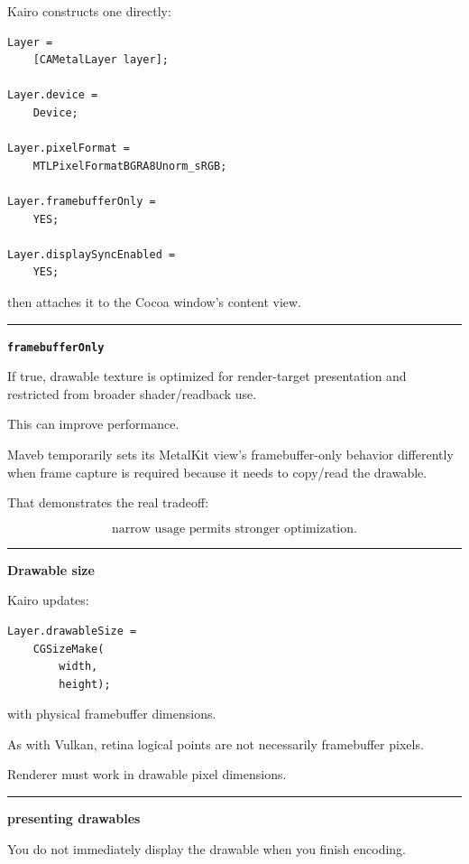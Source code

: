 Kairo constructs one directly:

\begin{verbatim}
Layer =
    [CAMetalLayer layer];

Layer.device =
    Device;

Layer.pixelFormat =
    MTLPixelFormatBGRA8Unorm_sRGB;

Layer.framebufferOnly =
    YES;

Layer.displaySyncEnabled =
    YES;
\end{verbatim}

then attaches it to the Cocoa window's content view.

\begin{center}\rule{0.5\linewidth}{0.5pt}\end{center}

\textbf{\texttt{framebufferOnly}}

If true, drawable texture is optimized for render-target presentation and restricted from broader shader/readback use.

This can improve performance.

Maveb temporarily sets its MetalKit view's framebuffer-only behavior differently when frame capture is required because it needs to copy/read the drawable.

That demonstrates the real tradeoff:

\[
\boxed{
\text{narrow usage permits stronger optimization}.
}
\]

\begin{center}\rule{0.5\linewidth}{0.5pt}\end{center}

\textbf{Drawable size}

Kairo updates:

\begin{verbatim}
Layer.drawableSize =
    CGSizeMake(
        width,
        height);
\end{verbatim}

with physical framebuffer dimensions.

As with Vulkan, retina logical points are not necessarily framebuffer pixels.

Renderer must work in drawable pixel dimensions.

\begin{center}\rule{0.5\linewidth}{0.5pt}\end{center}

\textbf{presenting drawables}

You do not immediately display the drawable when you finish encoding.

